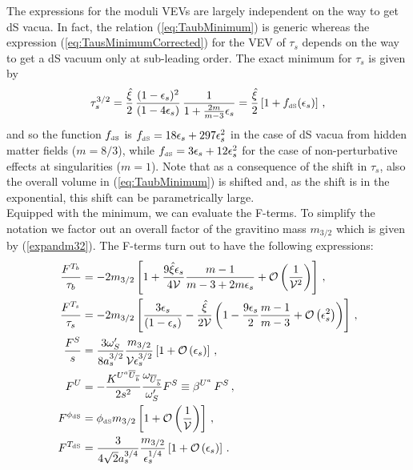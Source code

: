 \documentclass[12pt,a4paper]{book}
\def\dS{{\scriptscriptstyle \rm dS}}
\newcommand{\mc}{\mathcal}
\begin{document}
The expressions for the moduli VEVs are largely independent on the way to get dS vacua. In fact, the relation (\ref{eq:TaubMinimum}) is generic whereas the expression (\ref{eq:TausMinimumCorrected}) for the VEV of $\tau_s$ depends on the way to get a dS vacuum only at sub-leading order. The exact minimum for $\tau_s$ is given by
\begin{align}
\tau_s^{3/2}=\frac{\hat{\xi}}{2}\, \frac{(1-\epsilon_s)^2}{(1-4\epsilon_s)}\, \frac{1}{1+\frac{2m}{m-3} \epsilon_s}
=\frac{\hat{\xi}}{2}\left[1+f_\dS(\epsilon_s)\right]\,,
\label{eq:shiftds}
\end{align}
and so the function $f_\dS$ is $f_\dS= 18 \epsilon_s+297 \epsilon_s^2$ in the case of dS vacua from hidden matter fields ($m=8/3$),
while $f_\dS=3 \epsilon_s+12 \epsilon_s^2$ for the case of non-perturbative effects at singularities ($m=1$).
Note that as a consequence of the shift in $\tau_s$, also the overall volume in (\ref{eq:TaubMinimum}) is shifted and, as the shift is in the exponential, this shift can be parametrically large.\\

Equipped with the minimum, we can evaluate the F-terms. To simplify the notation we factor out an overall factor of the gravitino mass $m_{3/2}$ which is given by (\ref{expandm32}). The F-terms turn out to have the following expressions:
\begin{align}
\frac{F^{T_b}}{\tau_b}&=-2 m_{3/2}\left[1+\frac{9 \hat{\xi} \epsilon_s}{4 \mathcal{V}} \frac{m-1}{m-3+2m\epsilon_s} +\mc{O}\left(\frac{1}{\mathcal{V}^2}\right)\right]\,, \\
\frac{F^{T_s}}{\tau_s}&= -2 m_{3/2}\left[\frac{3\epsilon_s}{(1-\epsilon_s)}-\frac{\hat{\xi}}{2\mathcal{V}}
\left(1-\frac{9\epsilon_s}{2}\frac{m-1}{m-3}+\mc{O}\left(\epsilon_s^2\right)\right)\right]\,, \\
\frac{F^S}{s}&= \frac{3 \omega'_S }{8 a_s^{3/2}}  \frac{m_{3/2}}{\mathcal{V}\epsilon_s^{3/2}}\left[1+\mc{O}\left(\epsilon_s\right)\right]\,, \\
F^U&= - \frac{K^{U^a \overline{U}_{\overline{b}}}}{2 s^2}\frac{\omega_{\overline{U}_{\overline{b}}}}{\omega'_S}F^S\equiv \beta^{U^a}\,F^S\,, \\
F^{\phi_\dS} &= \phi_\dS m_{3/2}\left[1+ \mc{O}\left(\frac{1}{\mathcal{V}}\right)\right] \,, \\
F^{T_{\dS}}&= \frac{3}{4\sqrt{2}a_s^{3/4}}\frac{m_{3/2}}{\epsilon_s^{1/4}}\left[1+\mc{O}\left(\epsilon_s\right)\right]\,.
\end{align}
\end{document}
